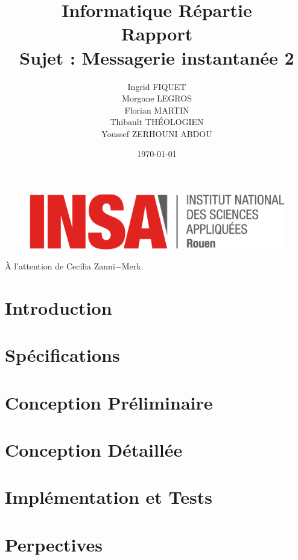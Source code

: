 \documentclass[a4paper,12pt]{article}
\title{\huge Informatique Répartie\\Rapport\\Sujet : Messagerie instantanée 2}
\author{Ingrid FIQUET\\Morgane LEGROS\\Florian MARTIN\\Thibault THÉOLOGIEN\\Youssef ZERHOUNI ABDOU}
\date{\today}
\begin{document}
	\begin{titlepage}
		\vfill
		\begin{figure}
			\includegraphics[scale=0.3]{img/logoINSARouen.png}
		\end{figure}

		\maketitle
		
		     
    \begin{center} 
    \LARGE
      \addvspace{10mm} 
      À l'attention de Cecilia Zanni$-$Merk. 
    \end{center} 

		\vfill
		\noindent \hrulefill

	\end{titlepage}



\newpage
\tableofcontents{}

\newpage
\part{Introduction}
	

\newpage
\part{Spécifications}
	
	
\newpage
\part{Conception Préliminaire}
	
	
\newpage
\part{Conception Détaillée}
	

\newpage
\part{Implémentation et Tests}
	
	
\newpage
\part{Perpectives}
	

\end{document}
